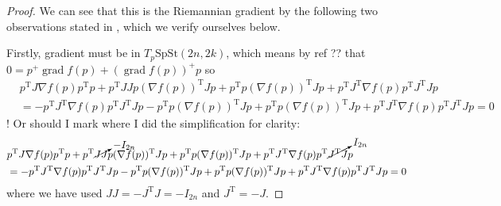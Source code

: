 \begin{proof}
    We can see that this is the Riemannian gradient by the following two observations stated in \cite{BZ}, which we verify ourselves below.

    Firstly, gradient must be in $T_{p}\mathrm{SpSt}(2n, 2k)$, which means by ref ?? that $0=p^{+}\operatorname{grad}f(p)+(\operatorname{grad}f(p))^{+}p$ so 
    \begin{equation}
        \begin{split}
        &p^{\mathrm{T}}J\nabla f(p)p^{\mathrm{T}}p+p^{\mathrm{T}}JJp(\nabla f(p))^{\mathrm{T}}Jp+p^{\mathrm{T}}p(\nabla f(p))^{\mathrm{T}}Jp+p^{\mathrm{T}}J^{\mathrm{T}}\nabla f(p)p^{\mathrm{T}}J^{\mathrm{T}}Jp\\
        &= -p^{\mathrm{T}}J^{\mathrm{T}}\nabla f(p)p^{\mathrm{T}}J^{\mathrm{T}}Jp-p^{\mathrm{T}}p(\nabla f(p))^{\mathrm{T}}Jp+p^{\mathrm{T}}p(\nabla f(p))^{\mathrm{T}}Jp+p^{\mathrm{T}}J^{\mathrm{T}}\nabla f(p)p^{\mathrm{T}}J^{\mathrm{T}}Jp=0
        \end{split}
    \end{equation}
    ! Or should I mark where I did the simplification for clarity:
    \begin{equation}
        \begin{split}
        &p^{\mathrm{T}}J\nabla f(p)p^{\mathrm{T}}p+p^{\mathrm{T}}\cancelto{-I_{2n}}{JJ}p(\nabla f(p))^{\mathrm{T}}Jp+p^{\mathrm{T}}p(\nabla f(p))^{\mathrm{T}}Jp+p^{\mathrm{T}}J^{\mathrm{T}}\nabla f(p)p^{\mathrm{T}}\cancelto{I_{2n}}{J^{\mathrm{T}}J}p\\
        &= -p^{\mathrm{T}}J^{\mathrm{T}}\nabla f(p)p^{\mathrm{T}}J^{\mathrm{T}}Jp-p^{\mathrm{T}}p(\nabla f(p))^{\mathrm{T}}Jp+p^{\mathrm{T}}p(\nabla f(p))^{\mathrm{T}}Jp+p^{\mathrm{T}}J^{\mathrm{T}}\nabla f(p)p^{\mathrm{T}}J^{\mathrm{T}}Jp=0
        \end{split}
    \end{equation}
    where we have used $JJ=-J^{\mathrm{T}}J=-I_{2n}$ and $J^{\mathrm{T}}=-J$.
    

\end{proof}
